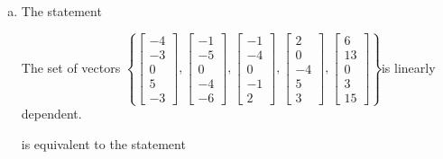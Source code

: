 \begin{exerciseAnswer}
\begin{enumerate}[(a)]
\item The statement 
\begin{center}\begin{minipage}{0.8\textwidth}
 The set of vectors \( \left\{ \left[\begin{array}{c}
-4 \\
-3 \\
0 \\
5 \\
-3
\end{array}\right] , \left[\begin{array}{c}
-1 \\
-5 \\
0 \\
-4 \\
-6
\end{array}\right] , \left[\begin{array}{c}
-1 \\
-4 \\
0 \\
-1 \\
2
\end{array}\right] , \left[\begin{array}{c}
2 \\
0 \\
-4 \\
5 \\
3
\end{array}\right] , \left[\begin{array}{c}
6 \\
13 \\
0 \\
3 \\
15
\end{array}\right] \right\} \)is linearly dependent.
\end{minipage}\end{center}
     is equivalent to the statement 
\begin{center}\begin{minipage}{0.8\textwidth}
 The vector equation \( x_{1} \left[\begin{array}{c}
-4 \\
-3 \\
0 \\
5 \\
-3
\end{array}\right] + x_{2} \left[\begin{array}{c}
-1 \\
-5 \\

\end{array}
\end{minipage}
\end{center}
\end{enumerate}
\end{exerciseAnswer}
